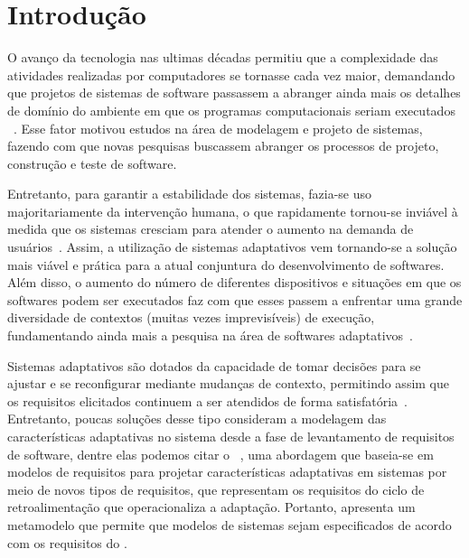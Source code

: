 
\chapter{Introdução}
\label{sec-intro}

O avanço da tecnologia nas ultimas décadas permitiu que a complexidade das atividades realizadas por computadores se tornasse cada vez maior, demandando que projetos de sistemas de software passassem a abranger ainda mais os detalhes de domínio do ambiente em que os programas computacionais seriam executados ~\cite{andersson2009modeling,brun2009engineering}. Esse fator motivou estudos na área de modelagem e projeto de sistemas, fazendo com que novas pesquisas buscassem abranger os processos de projeto, construção e teste de software. 

Entretanto, para garantir a estabilidade dos sistemas, fazia-se uso majoritariamente da intervenção humana, o que rapidamente tornou-se inviável à medida que os sistemas cresciam para atender o aumento na demanda de usuários~\cite{andersson2009modeling}. Assim, a utilização de sistemas adaptativos vem tornando-se a solução mais viável e prática para a atual conjuntura do desenvolvimento de softwares. Além disso, o aumento do número de diferentes dispositivos e situações em que os softwares podem ser executados faz com que esses passem a enfrentar uma grande diversidade de contextos (muitas vezes imprevisíveis) de execução, fundamentando ainda mais a pesquisa na área de softwares adaptativos~\cite{kephart2003vision}.

Sistemas adaptativos são dotados da capacidade de tomar decisões para se ajustar e se reconfigurar mediante mudanças de contexto, permitindo assim que os requisitos elicitados continuem a ser atendidos de forma satisfatória~\cite{souza2012requirement}. Entretanto, poucas soluções desse tipo consideram a modelagem das características adaptativas no sistema desde a fase de levantamento de requisitos de software, dentre elas podemos citar o \zanshin~\cite{tesevitor}, uma abordagem que baseia-se em modelos de requisitos para projetar características adaptativas em sistemas por meio de novos tipos de requisitos, que representam os requisitos do ciclo de retroalimentação que operacionaliza a adaptação. Portanto, \zanshin apresenta um metamodelo que permite que modelos de sistemas sejam especificados de acordo com os requisitos do \framework.

